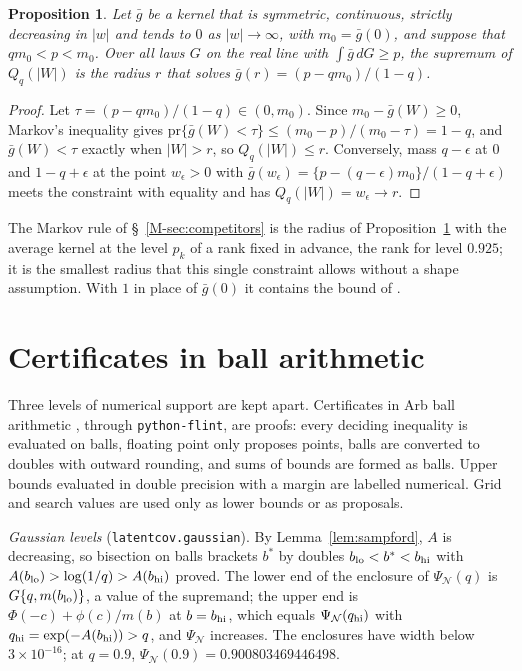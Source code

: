\documentclass[12pt]{article}
\renewcommand{\_}{\usc\allowbreak}
\newtheorem{proposition}{Proposition}
\theoremstyle{definition}
\numberwithin{equation}{section}
\newcommand{\pr}{\mathrm{pr}}
\newcommand{\N}{\mathcal{N}}
\begin{document}
\begin{proposition}\label{prop:shapefree}
Let $\bar g$ be a kernel that is symmetric, continuous, strictly decreasing in $|w|$ and tends to $0$ as $|w| \to \infty$, with $m_0 = \bar g(0)$, and suppose that $qm_0 < p < m_0$. Over all laws $G$ on the real line with $\int\bar g\,dG \ge p$, the supremum of $Q_q(|W|)$ is the radius $r$ that solves $\bar g(r) = (p - qm_0)/(1 - q)$.
\end{proposition}

\begin{proof}
Let $\tau = (p - qm_0)/(1 - q) \in (0, m_0)$. Since $m_0 - \bar g(W) \ge 0$, Markov's inequality gives $\pr\{\bar g(W) < \tau\} \le (m_0 - p)/(m_0 - \tau) = 1 - q$, and $\bar g(W) < \tau$ exactly when $|W| > r$, so $Q_q(|W|) \le r$. Conversely, mass $q - \epsilon$ at $0$ and $1 - q + \epsilon$ at the point $w_\epsilon > 0$ with $\bar g(w_\epsilon) = \{p - (q - \epsilon)m_0\}/(1 - q + \epsilon)$ meets the constraint with equality and has $Q_q(|W|) = w_\epsilon \to r$.
\end{proof}

The Markov rule of \S~\ref{M-sec:competitors} is the radius of Proposition~\ref{prop:shapefree} with the average kernel at the level $p_k$ of a rank fixed in advance, the rank for level $0.925$; it is the smallest radius that this single constraint allows without a shape assumption. With $1$ in place of $\bar g(0)$ it contains the bound of \citet{guille2024}.

\section{Certificates in ball arithmetic}\label{sec:s-ball}

Three levels of numerical support are kept apart. Certificates in Arb ball arithmetic \citep{johansson2017}, through \texttt{python-flint}, are proofs: every deciding inequality is evaluated on balls, floating point only proposes points, balls are converted to doubles with outward rounding, and sums of bounds are formed as balls. Upper bounds evaluated in double precision with a margin are labelled numerical. Grid and search values are used only as lower bounds or as proposals.

\emph{Gaussian levels} (\texttt{latentcov.gaussian}). By Lemma~\ref{lem:sampford}, $A$ is decreasing, so bisection on balls brackets $b^*$ by doubles $b_{\rm lo} < b^* < b_{\rm hi}$ with $A(b_{\rm lo}) > \log(1/q) > A(b_{\rm hi})$ proved. The lower end of the enclosure of $\Psi_{\N}(q)$ is $G\{q, m(b_{\rm lo})\}$, a value of the supremand; the upper end is $\Phi(-c) + \phi(c)/m(b)$ at $b = b_{\rm hi}$, which equals $\Psi_{\N}(q_{\rm hi})$ with $q_{\rm hi} = \exp(-A(b_{\rm hi})) > q$, and $\Psi_{\N}$ increases. The enclosures have width below $3 \times 10^{-16}$; at $q = 0.9$, $\Psi_{\N}(0.9) = 0.900803469446498$.
\end{document}
